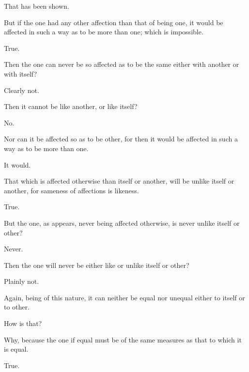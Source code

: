\documentclass[11pt,letter]{article}
\begin{document}
\par  That has been shown.

\par  But if the one had any other affection than that of being one, it would be affected in such a way as to be more than one; which is impossible.

\par  True.

\par  Then the one can never be so affected as to be the same either with another or with itself?

\par  Clearly not.

\par  Then it cannot be like another, or like itself?

\par  No.

\par  Nor can it be affected so as to be other, for then it would be affected in such a way as to be more than one.

\par  It would.

\par  That which is affected otherwise than itself or another, will be unlike itself or another, for sameness of affections is likeness.

\par  True.

\par  But the one, as appears, never being affected otherwise, is never unlike itself or other?

\par  Never.

\par  Then the one will never be either like or unlike itself or other?

\par  Plainly not.

\par  Again, being of this nature, it can neither be equal nor unequal either to itself or to other.

\par  How is that?

\par  Why, because the one if equal must be of the same measures as that to which it is equal.

\par  True.
\end{document}
